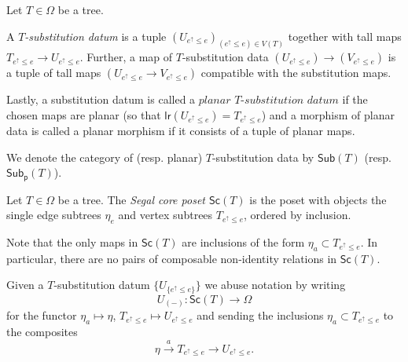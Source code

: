\documentclass[a4paper,10pt]{article}%
\begin{document}
\begin{definition}\label{SUBSTITUTIONDATUM}
	Let $T \in \Omega$ be a tree.
	
	A \textit{$T$-substitution datum} is a tuple 
	$\left(U_{e^{\uparrow} \leq e}\right)_{(e^{\uparrow} \leq e)\in V(T)}$ together with tall maps
	$T_{e^{\uparrow}\leq e} \to U_{e^{\uparrow}\leq e}$.
	Further, a map of $T$-substitution data 
	$\left(U_{e^{\uparrow} \leq e}\right) \to \left(V_{e^{\uparrow} \leq e}\right)$ is a tuple of tall maps $\left(U_{e^{\uparrow} \leq e}\to V_{e^{\uparrow} \leq e}\right)$ compatible with the substitution maps.
	
	Lastly, a substitution datum is called a $\textit{planar $T$-substitution datum}$ if the chosen maps are planar (so that 
	$\mathsf{lr}(U_{e^{\uparrow} \leq e}) = T_{e^{\uparrow} \leq e}$) and a morphism of planar data is called a planar morphism if it consists of a tuple of planar maps.
	
	We denote the category of (resp. planar) $T$-substitution data 
	by $\mathsf{Sub}(T)$ (resp. $\mathsf{Sub}_{\mathsf{p}}(T)$).
\end{definition}

\begin{definition}
	Let $T \in \Omega$ be a tree. 
	The \textit{Segal core poset $\mathsf{Sc}(T)$} is the poset with objects the single edge subtrees $\eta_e$ and vertex subtrees $T_{e^{\uparrow} \leq e}$, ordered by inclusion.
\end{definition}


\begin{remark}
Note that the only maps in $\mathsf{Sc}(T)$ are inclusions of the form $\eta_a \subset T_{e^{\uparrow}\leq e}$.
In particular, there are no pairs of composable non-identity relations in $\mathsf{Sc}(T)$. 
\end{remark}

Given a $T$-substitution datum $\{U_{\{e^{\uparrow}\leq e\}}\}$ we abuse notation by writing
\[U_{(\minus)} \colon \mathsf{Sc}(T) \to \Omega\]
for the functor $\eta_a \mapsto \eta$, $T_{e^{\uparrow} \leq e} \mapsto U_{e^{\uparrow} \leq e}$  
and sending the inclusions $\eta_a \subset T_{e^{\uparrow} \leq e}$
to the composites
\[
\eta \xrightarrow{a} T_{e^{\uparrow} \leq e}  \to 
U_{e^{\uparrow} \leq e}.\]
\end{document}

